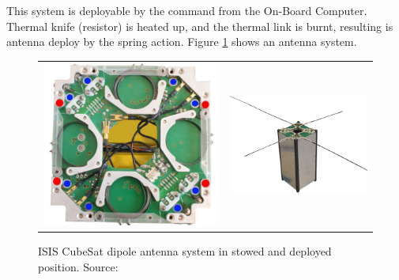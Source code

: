 This system is deployable by the command from the On-Board Computer. Thermal knife (resistor) is heated up, and the thermal link is burnt, resulting is antenna deploy by the spring action. Figure \ref{ISIS_antenna} shows an antenna system.

\begin{figure}
   \centering
\begin{tabular}{cc}
        \includegraphics[width=0.3\paperwidth]{img/6/isis_antenna_stowed.jpg}
    & 
        \includegraphics[width=0.45\paperwidth]{img/6/CubeSat-antenna-dipole-configuration.png}    
\end{tabular}
\label{ISIS_antenna}
\caption{ISIS CubeSat dipole antenna system in stowed and deployed position. Source: \cite{isis_dipole_antenna}}
\end{figure}


